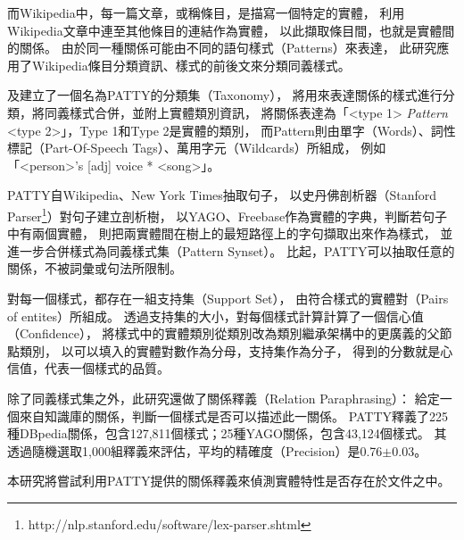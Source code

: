 而Wikipedia中，每一篇文章，或稱條目，是描寫一個特定的實體，
\cite{wisenet} 利用Wikipedia文章中連至其他條目的連結作為實體，
以此擷取條目間，也就是實體間的關係。
由於同一種關係可能由不同的語句樣式（Patterns）來表達，
此研究應用了Wikipedia條目分類資訊、樣式的前後文來分類同義樣式。

\cite{patty2012}及\cite{patty}建立了一個名為PATTY的分類集（Taxonomy），
將用來表達關係的樣式進行分類，將同義樣式合併，並附上實體類別資訊，
將關係表達為「<type 1> \emph{Pattern} <type 2>」，Type 1和Type 2是實體的類別，
而Pattern則由單字（Words）、詞性標記（Part-Of-Speech Tags）、萬用字元（Wildcards）所組成，
例如「<person>'s [adj] voice * <song>」。   %

PATTY自Wikipedia、New York Times抽取句子，
以史丹佛剖析器（Stanford Parser\footnote{http://nlp.stanford.edu/software/lex-parser.shtml}）對句子建立剖析樹，
以YAGO、Freebase作為實體的字典，判斷若句子中有兩個實體，
則把兩實體間在樹上的最短路徑上的字句擷取出來作為樣式，
並進一步合併樣式為同義樣式集（Pattern Synset）。
比起\cite{reverb}，PATTY可以抽取任意的關係，不被詞彙或句法所限制。

對每一個樣式，都存在一組支持集（Support Set），
由符合樣式的實體對（Pairs of entites）所組成。
透過支持集的大小，對每個樣式計算計算了一個信心值（Confidence），
將樣式中的實體類別從類別改為類別繼承架構中的更廣義的父節點類別，
以可以填入的實體對數作為分母，支持集作為分子，
得到的分數就是心信值，代表一個樣式的品質。

除了同義樣式集之外，此研究還做了關係釋義（Relation Paraphrasing）：
給定一個來自知識庫的關係，判斷一個樣式是否可以描述此一關係。
PATTY釋義了225種DBpedia關係，包含127,811個樣式；25種YAGO關係，包含43,124個樣式。
其透過隨機選取1,000組釋義來評估，平均的精確度（Precision）是0.76$\pm$0.03。

本研究將嘗試利用PATTY提供的關係釋義來偵測實體特性是否存在於文件之中。   %

